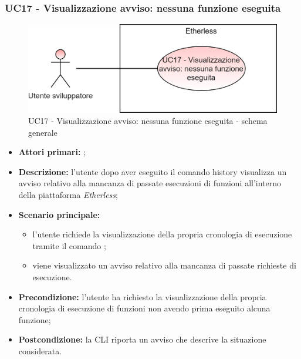 \subsubsection{UC17 - Visualizzazione avviso: nessuna funzione eseguita}
\begin{figure}[H]
	\centering
	\includegraphics[scale=\ucs]{./res/img/UC17G.png}
	\caption {UC17 - Visualizzazione avviso: nessuna funzione eseguita - schema generale}
\end{figure}
\begin{itemize}
	\item \textbf{Attori primari:} \us{};
	\item \textbf{Descrizione:} l’utente dopo aver eseguito il comando history visualizza un avviso relativo alla mancanza di passate esecuzioni di funzioni all’interno della piattaforma \textit{Etherless};
	\item \textbf{Scenario principale:} 
	\begin{itemize}
		\item l’utente richiede la visualizzazione della propria cronologia di esecuzione tramite il comando \history{};
		\item viene visualizzato un avviso relativo alla mancanza di passate richieste di esecuzione.
	\end{itemize}
	\item \textbf{Precondizione:}  l’utente ha richiesto la visualizzazione della propria cronologia di esecuzione di funzioni non avendo prima eseguito alcuna funzione;
	\item \textbf{Postcondizione:} la CLI riporta un avviso che descrive la situazione considerata.  
\end{itemize}